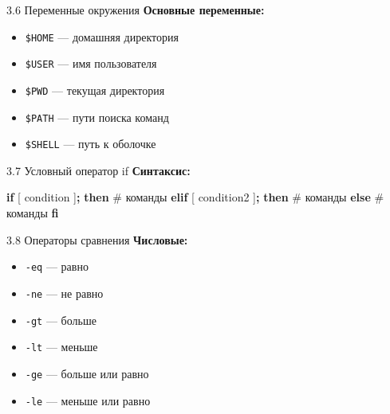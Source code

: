 \documentclass[
  ignorenonframetext,
  aspectratio=169,
  russian,
]{beamer}
\newenvironment{Shaded}{\begin{snugshade}}{\end{snugshade}}
\newcommand{\BuiltInTok}[1]{\textcolor[rgb]{0.00,0.23,0.31}{#1}}
\newcommand{\CommentTok}[1]{\textcolor[rgb]{0.37,0.37,0.37}{#1}}
\newcommand{\ControlFlowTok}[1]{\textcolor[rgb]{0.00,0.23,0.31}{\textbf{#1}}}
\newcommand{\KeywordTok}[1]{\textcolor[rgb]{0.00,0.23,0.31}{\textbf{#1}}}
\newcommand{\NormalTok}[1]{\textcolor[rgb]{0.00,0.23,0.31}{#1}}
\providecommand{\tightlist}{%
  \setlength{\itemsep}{0pt}\setlength{\parskip}{0pt}}
\begin{document}
\begin{frame}[fragile]{3.6 Переменные окружения}
\label{ux43fux435ux440ux435ux43cux435ux43dux43dux44bux435-ux43eux43aux440ux443ux436ux435ux43dux438ux44f}
\textbf{Основные переменные:}

\begin{itemize}[<+->]
\tightlist
\item
  \texttt{\$HOME} --- домашняя директория
\item
  \texttt{\$USER} --- имя пользователя
\item
  \texttt{\$PWD} --- текущая директория
\item
  \texttt{\$PATH} --- пути поиска команд
\item
  \texttt{\$SHELL} --- путь к оболочке
\end{itemize}
\end{frame}

\begin{frame}[fragile]{3.7 Условный оператор if}
\label{ux443ux441ux43bux43eux432ux43dux44bux439-ux43eux43fux435ux440ux430ux442ux43eux440-if}
\textbf{Синтаксис:}

\begin{Shaded}
\begin{Highlighting}[]
\ControlFlowTok{if} \BuiltInTok{[}\NormalTok{ condition }\BuiltInTok{]}\KeywordTok{;} \ControlFlowTok{then}
    \CommentTok{\# команды}
\ControlFlowTok{elif} \BuiltInTok{[}\NormalTok{ condition2 }\BuiltInTok{]}\KeywordTok{;} \ControlFlowTok{then}
    \CommentTok{\# команды}
\ControlFlowTok{else}
    \CommentTok{\# команды}
\ControlFlowTok{fi}
\end{Highlighting}
\end{Shaded}
\end{frame}

\begin{frame}[fragile]{3.8 Операторы сравнения}
\label{ux43eux43fux435ux440ux430ux442ux43eux440ux44b-ux441ux440ux430ux432ux43dux435ux43dux438ux44f}
\textbf{Числовые:}

\begin{itemize}[<+->]
\tightlist
\item
  \texttt{-eq} --- равно
\item
  \texttt{-ne} --- не равно
\item
  \texttt{-gt} --- больше
\item
  \texttt{-lt} --- меньше
\item
  \texttt{-ge} --- больше или равно
\item
  \texttt{-le} --- меньше или равно
\end{itemize}
\end{frame}
\end{document}
